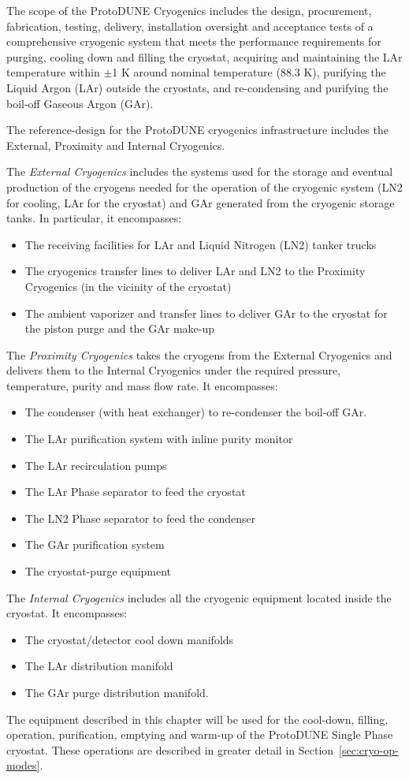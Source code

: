 The scope of the ProtoDUNE Cryogenics includes the design, procurement, fabrication, testing, delivery, installation oversight and acceptance tests of a comprehensive cryogenic system that meets the performance requirements for purging, cooling down and filling the cryostat, acquiring and maintaining the LAr temperature within $\pm$1 K around nominal temperature (88.3 K), purifying the Liquid Argon (LAr) outside the cryostats, and re-condensing and purifying the boil-off Gaseous Argon (GAr).

The reference-design for the ProtoDUNE cryogenics infrastructure includes the External, Proximity and Internal Cryogenics.

%
The {\it External Cryogenics} includes the systems used for the storage and eventual production of the cryogens needed for the operation of the cryogenic system (LN2 for cooling, LAr for the cryostat) and GAr generated from the cryogenic storage tanks. In particular, it encompasses:
%
\begin{itemize}
\item The receiving facilities for LAr and Liquid Nitrogen (LN2) tanker trucks
\item The cryogenics transfer lines to deliver LAr and LN2 to the Proximity Cryogenics (in the vicinity of the cryostat)
\item The ambient vaporizer and transfer lines to deliver GAr to the cryostat for the piston purge and the GAr make-up
\end{itemize}
%
The {\it Proximity Cryogenics} takes the cryogens from the External Cryogenics and delivers them to the Internal Cryogenics under the required pressure, temperature, purity and mass flow rate. It encompasses:
%
\begin{itemize}
\item The condenser (with heat exchanger) to re-condenser the boil-off GAr.
\item The LAr purification system with inline purity monitor
\item The LAr recirculation pumps
\item The LAr Phase separator to feed the cryostat
\item The LN2 Phase separator to feed the condenser
\item The GAr purification system
\item The cryostat-purge equipment
\end{itemize}
%
The {\it Internal Cryogenics} includes all the cryogenic equipment located inside the cryostat. It encompasses:
%
\begin{itemize}
\item The cryostat/detector cool down manifolds
\item The LAr distribution manifold
\item The GAr purge distribution manifold.
\end{itemize}
%
The equipment described in this chapter will be used for the cool-down, filling, operation, purification, emptying and warm-up of the ProtoDUNE Single Phase cryostat. These operations are described in greater detail in Section~\ref{sec:cryo-op-modes}.

